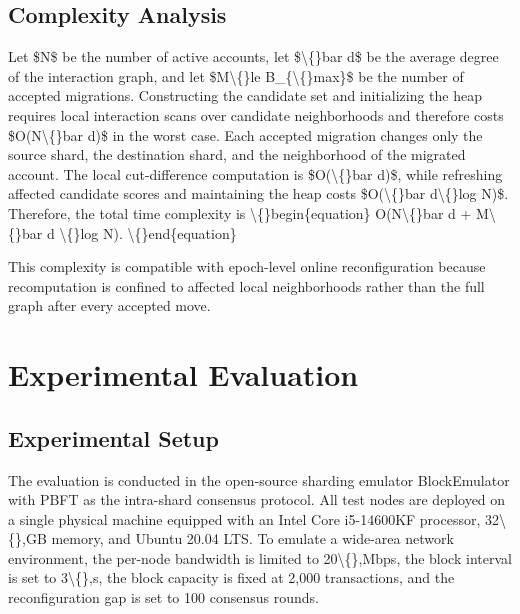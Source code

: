 \documentclass{article}
\begin{document}
\subsection{Complexity Analysis}\label{sec:complexity-analysis}

Let \$N\$ be the number of active accounts, let \$\textbackslash\{\}bar d\$ be the average degree of the interaction graph, and let \$M\textbackslash\{\}le B\_\{\textbackslash\{\}max\}\$ be the number of accepted migrations. Constructing the candidate set and initializing the heap requires local interaction scans over candidate neighborhoods and therefore costs \$O(N\textbackslash\{\}bar d)\$ in the worst case. Each accepted migration changes only the source shard, the destination shard, and the neighborhood of the migrated account. The local cut-difference computation is \$O(\textbackslash\{\}bar d)\$, while refreshing affected candidate scores and maintaining the heap costs \$O(\textbackslash\{\}bar d\textbackslash\{\}log N)\$. Therefore, the total time complexity is
\textbackslash\{\}begin\{equation\}
O(N\textbackslash\{\}bar d + M\textbackslash\{\}bar d \textbackslash\{\}log N).
\textbackslash\{\}end\{equation\}

This complexity is compatible with epoch-level online reconfiguration because recomputation is confined to affected local neighborhoods rather than the full graph after every accepted move.

\section{Experimental Evaluation}\label{sec:experimental-evaluation}



\subsection{Experimental Setup}\label{sec:experimental-setup}

The evaluation is conducted in the open-source sharding emulator BlockEmulator with PBFT as the intra-shard consensus protocol. All test nodes are deployed on a single physical machine equipped with an Intel Core i5-14600KF processor, 32\textbackslash\{\},GB memory, and Ubuntu 20.04 LTS. To emulate a wide-area network environment, the per-node bandwidth is limited to 20\textbackslash\{\},Mbps, the block interval is set to 3\textbackslash\{\},s, the block capacity is fixed at 2,000 transactions, and the reconfiguration gap is set to 100 consensus rounds.
\end{document}
